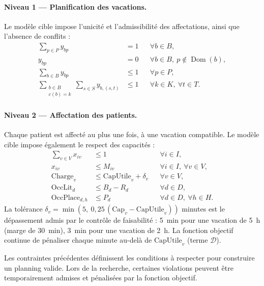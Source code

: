 \documentclass[11pt,a4paper]{article}
\begin{document}
\paragraph{Niveau 1 --- Planification des vacations.}
Le modèle cible impose l'unicité et l'admissibilité des affectations, ainsi que l'absence de conflits :
\begin{align}
\sum_{p\in P}y_{bp}&=1 &&\forall b\in B,\label{eq:n1-unique}\\
y_{bp}&=0 &&\forall b\in B,\ p\notin\operatorname{Dom}(b),\label{eq:n1-domaine}\\
\sum_{b\in B}y_{bp}&\le1 &&\forall p\in P,\label{eq:n1-salle}\\
\sum_{\substack{b\in B\\c(b)=k}}\sum_{s\in S}y_{b,(s,t)}&\le1 &&\forall k\in K,\ \forall t\in T.\label{eq:n1-chir}
\end{align}

\paragraph{Niveau 2 --- Affectation des patients.}
Chaque patient est affecté au plus une fois, à une vacation compatible. Le modèle cible impose également le respect des capacités :
\begin{align}
\sum_{v\in V}x_{iv}&\le1 &&\forall i\in I,\label{eq:n2-unique}\\
x_{iv}&\le M_{iv} &&\forall i\in I,\ \forall v\in V,\label{eq:n2-compat}\\
\mathrm{Charge}_v&\le\mathrm{CapUtile}_v+\delta_v &&\forall v\in V,\label{eq:n2-bloc}\\
\mathrm{OccLit}_d&\le B_d-R_d &&\forall d\in D,\label{eq:n2-lits}\\
\mathrm{OccPlace}_{d,h}&\le P_d
&&\forall d\in D,\ \forall h\in H.
\label{eq:n2-places}
\end{align}
La tolérance $\delta_v=\min\!\left(5,\ 0{,}25\,(\mathrm{Cap}_v-\mathrm{CapUtile}_v)\right)$ minutes est le dépassement admis par le contrôle de faisabilité : 5~min pour une vacation de 5~h (marge de 30~min), 3~min pour une vacation de 2~h. La fonction objectif continue de pénaliser chaque minute au-delà de $\mathrm{CapUtile}_v$ (terme $\mathcal{D}$).


Les contraintes précédentes définissent les conditions
à respecter pour construire un planning valide.
Lors de la recherche, certaines violations peuvent être
temporairement admises et pénalisées par la fonction objectif.
\end{document}
